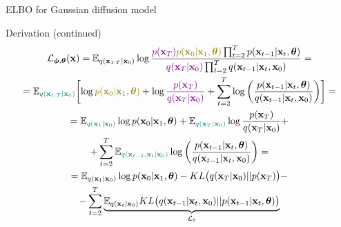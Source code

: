 \begin{frame}{ELBO for Gaussian diffusion model}
	\begin{block}{Derivation (continued)}
		\vspace{-0.7cm}
		{\small
		\begin{multline*}
			\cL_{\bphi, \btheta}(\bx) = \bbE_{q(\bx_{1:T} | \bx_0)} \log \frac{{\color{violet}p(\bx_T)} {\color{olive}p(\bx_0 | \bx_1, \btheta)} \prod_{t=2}^T p(\bx_{t-1} | \bx_t, \btheta) }{{\color{violet}q(\bx_T | \bx_0)}\prod_{t=2}^T q(\bx_{t-1}|\bx_t, \bx_0)}  = \\
			= \bbE_{{\color{teal}q(\bx_{1:T} | \bx_0)}} \biggl[ \log {\color{olive}p(\bx_0 | \bx_1, \btheta)} + \log {\color{violet}\frac{p(\bx_T)}{q(\bx_T | \bx_0)}} + \sum_{t=2}^T \log \left( \frac{p(\bx_{t-1} | \bx_t, \btheta)}{q(\bx_{t-1}|\bx_{t}, \bx_0)}\right) \biggr] = \\
			 = \bbE_{{\color{teal}q(\bx_1 | \bx_0)}} \log p(\bx_0 | \bx_1, \btheta) + \bbE_{{\color{teal}q(\bx_T | \bx_0)}} \log \frac{p(\bx_T)}{q(\bx_T | \bx_0)} + \\
			  + \sum_{t=2}^T \bbE_{{\color{teal}q(\bx_{t-1}, \bx_t | \bx_0)}} \log \left( \frac{p(\bx_{t-1} | \bx_t, \btheta)}{q(\bx_{t-1}|\bx_{t}, \bx_0)}\right) = \\
			  = \bbE_{q(\bx_1 | \bx_0)} \log p(\bx_0 | \bx_1, \btheta) - KL\bigl(q(\bx_T | \bx_0) || p(\bx_T)\bigr) - \\
			  			- \sum_{t=2}^T \underbrace{ \bbE_{q(\bx_t | \bx_0)} KL \bigl(q(\bx_{t-1} | \bx_t, \bx_0) || p(\bx_{t - 1} | \bx_t, \btheta )\bigr)}_{\cL_t}
		\end{multline*}
		}
		\vspace{-0.3cm}
	\end{block}
\end{frame}
